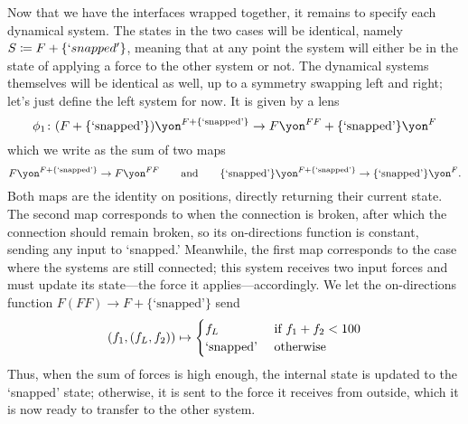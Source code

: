 \documentclass[Book-Poly]{subfiles}
\begin{document}
\begin{example}
Now that we have the interfaces wrapped together, it remains to specify each dynamical system.
The states in the two cases will be identical, namely $S\coloneqq F+\{`snapped'\}$, meaning that at any point the system will either be in the state of applying a force to the other system or not.
The dynamical systems themselves will be identical as well, up to a symmetry swapping left and right; let's just define the left system for now.
It is given by a lens
\[\phi_1\colon (F+\{\text{`snapped'}\})\yon^{F+\{\text{`snapped'}\}}\to F\yon^{FF}+\{\text{`snapped'}\}\yon^F\]
which we write as the sum of two maps
\[F\yon^{F+\{\text{`snapped'}\}}\to F\yon^{FF} \qqand \{\text{`snapped'}\}\yon^{F+\{\text{`snapped'}\}}\to\{\text{`snapped'}\}\yon^F.\]
Both maps are the identity on positions, directly returning their current state.
The second map corresponds to when the connection is broken, after which the connection should remain broken, so its on-directions function is constant, sending any input to `snapped.'
Meanwhile, the first map corresponds to the case where the systems are still connected; this system receives two input forces and must update its state---the force it applies---accordingly.
We let the on-directions function $F(FF)\to F+\{\text{`snapped'}\}$ send
\[
(f_1,(f_L,f_2))\mapsto
\begin{cases}
	f_L&\textnormal{ if }f_1+f_2<100\\
	\text{`snapped'}&\textnormal{ otherwise}
\end{cases}
\]
Thus, when the sum of forces is high enough, the internal state is updated to the `snapped' state; otherwise, it is sent to the force it receives from outside, which it is now ready to transfer to the other system.
\end{example}
\end{document}
